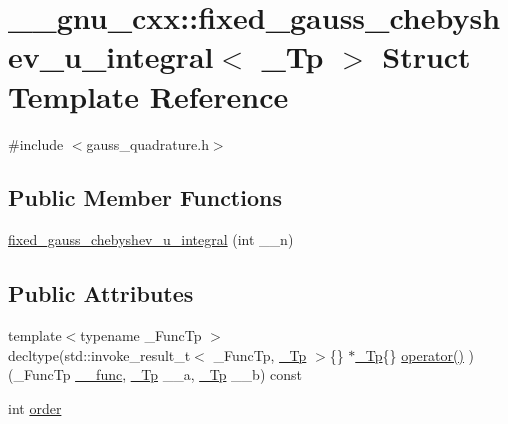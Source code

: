 \hypertarget{struct____gnu__cxx_1_1fixed__gauss__chebyshev__u__integral}{}\section{\+\_\+\+\_\+gnu\+\_\+cxx\+:\+:fixed\+\_\+gauss\+\_\+chebyshev\+\_\+u\+\_\+integral$<$ \+\_\+\+Tp $>$ Struct Template Reference}
\label{struct____gnu__cxx_1_1fixed__gauss__chebyshev__u__integral}


{\ttfamily \#include $<$gauss\+\_\+quadrature.\+h$>$}

\subsection*{Public Member Functions}
\begin{DoxyCompactItemize}
\item 
\hyperlink{struct____gnu__cxx_1_1fixed__gauss__chebyshev__u__integral_a4e0aa98609c6a0621ebdb09ddfa27116}{fixed\+\_\+gauss\+\_\+chebyshev\+\_\+u\+\_\+integral} (int \+\_\+\+\_\+n)
\end{DoxyCompactItemize}
\subsection*{Public Attributes}
\begin{DoxyCompactItemize}
\item 
{\footnotesize template$<$typename \+\_\+\+Func\+Tp $>$ }\\decltype(std\+::invoke\+\_\+result\+\_\+t$<$ \+\_\+\+Func\+Tp, \hyperlink{namespace____gnu__cxx_a3b19a9c800ca194374ef9172290f7d79}{\+\_\+\+Tp} $>$\{\} $\ast$\hyperlink{namespace____gnu__cxx_a3b19a9c800ca194374ef9172290f7d79}{\+\_\+\+Tp}\{\} \hyperlink{struct____gnu__cxx_1_1fixed__gauss__chebyshev__u__integral_a2d37d0d8a816c260b98b4edc2e348b24}{operator()} )(\+\_\+\+Func\+Tp \hyperlink{namespace____gnu__cxx_af2b2f0c7a2ae72b922b1afefae5a65b2}{\+\_\+\+\_\+func}, \hyperlink{namespace____gnu__cxx_a3b19a9c800ca194374ef9172290f7d79}{\+\_\+\+Tp} \+\_\+\+\_\+a, \hyperlink{namespace____gnu__cxx_a3b19a9c800ca194374ef9172290f7d79}{\+\_\+\+Tp} \+\_\+\+\_\+b) const
\item 
int \hyperlink{struct____gnu__cxx_1_1fixed__gauss__chebyshev__u__integral_a497180b192f0df1eb43c488537a861ca}{order}
\end{DoxyCompactItemize}


